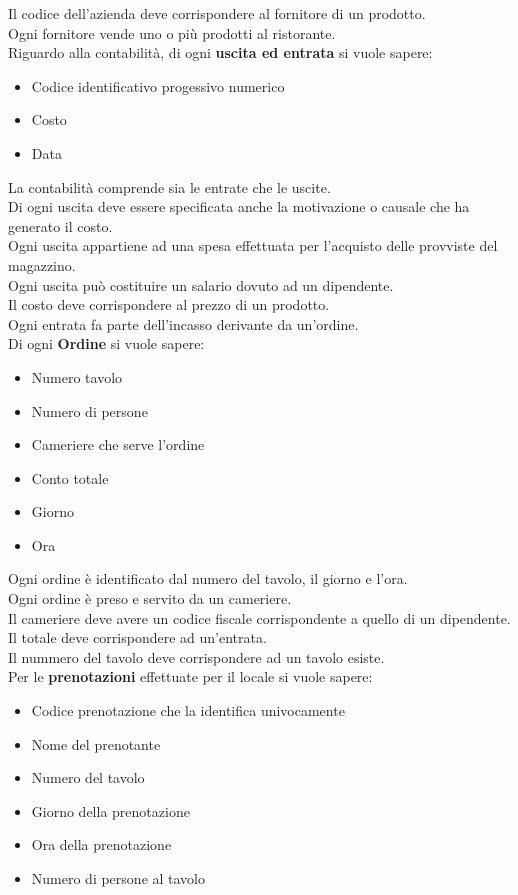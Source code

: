 Il codice dell'azienda deve corrispondere al fornitore di un prodotto. \\
Ogni fornitore vende uno o più prodotti al ristorante. \medskip \\
Riguardo alla contabilità, di ogni \textbf{uscita ed entrata} si vuole sapere:
\begin{itemize}
    \item Codice identificativo progessivo numerico
    \item Costo %
    \item Data
\end{itemize}
La contabilità comprende sia le entrate che le uscite. \\
Di ogni uscita deve essere specificata anche la motivazione o causale che ha generato il costo. \\
Ogni uscita appartiene ad una spesa effettuata per l'acquisto delle provviste del magazzino. \\
Ogni uscita può costituire un salario dovuto ad un dipendente. \\
Il costo deve corrispondere al prezzo di un prodotto. \\
Ogni entrata fa parte dell'incasso derivante da un'ordine. \medskip \\
Di ogni \textbf{Ordine} si vuole sapere:
\begin{itemize}
    \item Numero tavolo 
    \item Numero di persone 
    \item Cameriere che serve l'ordine
    \item Conto totale
    \item Giorno
    \item Ora
\end{itemize}
Ogni ordine è identificato dal numero del tavolo, il giorno e l'ora. \\
Ogni ordine è preso e servito da un cameriere. \\
Il cameriere deve avere un codice fiscale corrispondente a quello di un dipendente. \\
Il totale deve corrispondere ad un'entrata. \\
Il nummero del tavolo deve corrispondere ad un tavolo esiste. \medskip \\
Per le \textbf{prenotazioni} effettuate per il locale si vuole sapere:
\begin{itemize}
    \item Codice prenotazione che la identifica univocamente %
    \item Nome del prenotante
    \item Numero del tavolo
    \item Giorno della prenotazione
    \item Ora della prenotazione
    \item Numero di persone al tavolo
\end{itemize}
